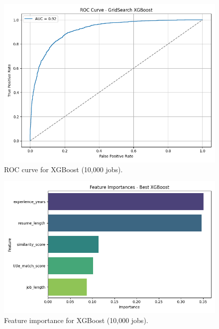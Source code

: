 \documentclass[a4paper]{article}
\begin{document}
\begin{multicols}{2}
\begin{figure}[H]
\centering
\includegraphics[width=0.7\linewidth]{Images/roc_xgb_10000.png}
\caption{ROC curve for XGBoost (10,000 jobs).}
\end{figure}

\begin{figure}[H]
\centering
\includegraphics[width=0.8\linewidth]{Images/featimp_xgb_10000.png}
\caption{Feature importance for XGBoost (10,000 jobs).}
\end{figure}







\end{multicols}
\end{document}
